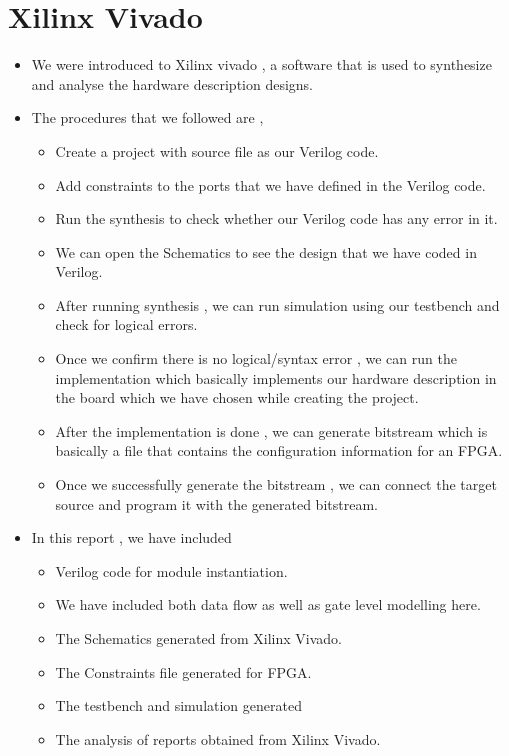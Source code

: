 \documentclass{article}
\begin{document}
\section*{Xilinx Vivado}
\begin{itemize}
    \item We were introduced to Xilinx vivado , a software that is used to synthesize and analyse the hardware description designs.
    \item The procedures that we followed are ,
    \begin{itemize}
        \item Create a project with source file as our Verilog code.
        \item Add constraints to the ports that we have defined in the Verilog code.
        \item Run the synthesis to check whether our Verilog code has any error in it.
        \item We can open the Schematics to see the design that we have coded in Verilog.
        \item After running synthesis , we can run simulation using our testbench and check for logical errors.
        \item Once we confirm there is no logical/syntax error , we can run the implementation which basically implements our hardware description in the board which we have chosen while creating the project.
        \item After the implementation is done , we can generate bitstream which is basically a file that contains the configuration information for an FPGA.
        \item Once we successfully generate the bitstream , we can connect the target source and program it with the generated bitstream.
    \end{itemize}
    \item In this report , we have included 
    \begin{itemize}
        \item Verilog code for module instantiation.
        \item We have included both data flow as well as gate level modelling here.
        \item The Schematics generated from Xilinx Vivado.
        \item The Constraints file generated for FPGA.
        \item The testbench and simulation generated
        \item The analysis of reports obtained from Xilinx Vivado.
    \end{itemize}
\end{itemize}

\end{document}
